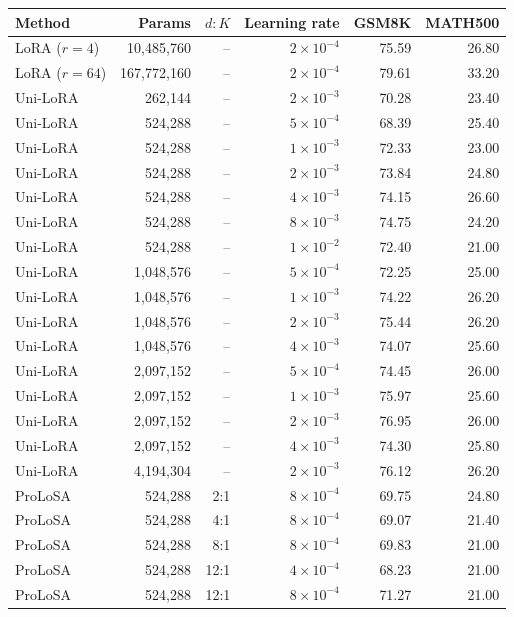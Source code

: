 \begin{table}[p]
\centering
\small
\setlength{\tabcolsep}{5pt}
\begin{tabular}{lrrrrr}
\toprule
Method & Params & $d:K$ & Learning rate & GSM8K & MATH500 \\
\midrule
LoRA ($r=4$) & 10,485,760 & -- & $2\times10^{-4}$ & 75.59 & 26.80 \\
LoRA ($r=64$) & 167,772,160 & -- & $2\times10^{-4}$ & 79.61 & 33.20 \\
\midrule
Uni-LoRA & 262,144 & -- & $2\times10^{-3}$ & 70.28 & 23.40 \\
Uni-LoRA & 524,288 & -- & $5\times10^{-4}$ & 68.39 & 25.40 \\
Uni-LoRA & 524,288 & -- & $1\times10^{-3}$ & 72.33 & 23.00 \\
Uni-LoRA & 524,288 & -- & $2\times10^{-3}$ & 73.84 & 24.80 \\
Uni-LoRA & 524,288 & -- & $4\times10^{-3}$ & 74.15 & 26.60 \\
Uni-LoRA & 524,288 & -- & $8\times10^{-3}$ & 74.75 & 24.20 \\
Uni-LoRA & 524,288 & -- & $1\times10^{-2}$ & 72.40 & 21.00 \\
Uni-LoRA & 1,048,576 & -- & $5\times10^{-4}$ & 72.25 & 25.00 \\
Uni-LoRA & 1,048,576 & -- & $1\times10^{-3}$ & 74.22 & 26.20 \\
Uni-LoRA & 1,048,576 & -- & $2\times10^{-3}$ & 75.44 & 26.20 \\
Uni-LoRA & 1,048,576 & -- & $4\times10^{-3}$ & 74.07 & 25.60 \\
Uni-LoRA & 2,097,152 & -- & $5\times10^{-4}$ & 74.45 & 26.00 \\
Uni-LoRA & 2,097,152 & -- & $1\times10^{-3}$ & 75.97 & 25.60 \\
Uni-LoRA & 2,097,152 & -- & $2\times10^{-3}$ & 76.95 & 26.00 \\
Uni-LoRA & 2,097,152 & -- & $4\times10^{-3}$ & 74.30 & 25.80 \\
Uni-LoRA & 4,194,304 & -- & $2\times10^{-3}$ & 76.12 & 26.20 \\
\midrule
ProLoSA & 524,288 & 2:1 & $8\times10^{-4}$ & 69.75 & 24.80 \\
ProLoSA & 524,288 & 4:1 & $8\times10^{-4}$ & 69.07 & 21.40 \\
ProLoSA & 524,288 & 8:1 & $8\times10^{-4}$ & 69.83 & 21.00 \\
ProLoSA & 524,288 & 12:1 & $4\times10^{-4}$ & 68.23 & 21.00 \\
ProLoSA & 524,288 & 12:1 & $8\times10^{-4}$ & 71.27 & 21.00 \\

\end{tabular}
\end{table}
